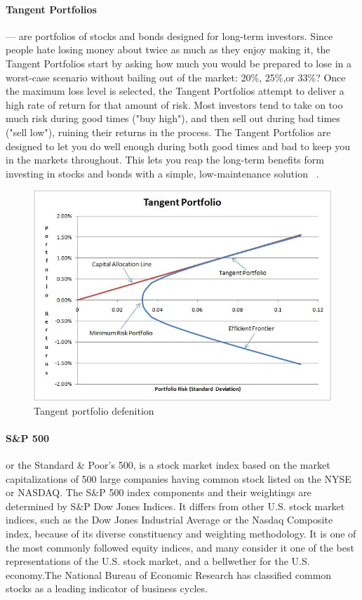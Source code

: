 \paragraph*{Tangent Portfolios} --- are portfolios of stocks and bonds designed for long-term investors. Since people hate losing money about twice as much as they enjoy making it, the Tangent Portfolios start by asking how much you would be prepared to lose in a worst-case scenario without bailing out of the market: 20\%, 25\%,or 33\%? Once the maximum loss level is selected, the Tangent Portfolios attempt to deliver a high rate of return for that amount of risk.
    Most investors tend to take on too much risk during good times ("buy high"), and then sell out during bad times ("sell low"), ruining their returns in the process. The Tangent Portfolios are designed to let you do well enough during both good times and bad to keep you in the markets throughout. This lets you reap the long-term benefits form investing in stocks and bonds with a simple, low-maintenance solution ~\cite{Sel4}.

\begin{figure}[b!]
	\centering
	\includegraphics[width=1.0\textwidth,clip,keepaspectratio]{src/Pr4/1.jpg}
	\caption{Tangent portfolio defenition}
	\label{fig:s1}
\end{figure}
 
\paragraph*{S\&P 500} or the Standard \& Poor's 500, is a stock market index based on the market capitalizations of 500 large companies having common stock listed on the NYSE or NASDAQ. The S\&P 500 index components and their weightings are determined by S\&P Dow Jones Indices. It differs from other U.S. stock market indices, such as the Dow Jones Industrial Average or the Nasdaq Composite index, because of its diverse constituency and weighting methodology. It is one of the most commonly followed equity indices, and many consider it one of the best representations of the U.S. stock market, and a bellwether for the U.S. economy.The National Bureau of Economic Research has classified common stocks as a leading indicator of business cycles.

